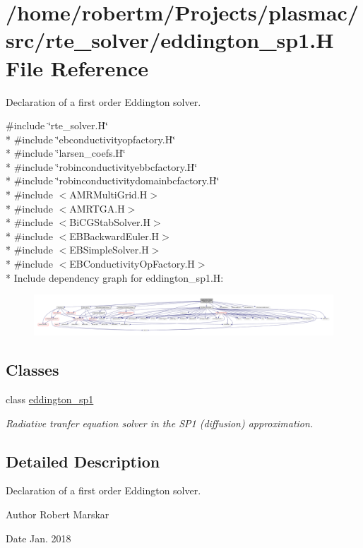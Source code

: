\hypertarget{eddington__sp1_8H}{}\section{/home/robertm/\+Projects/plasmac/src/rte\+\_\+solver/eddington\+\_\+sp1.H File Reference}
\label{eddington__sp1_8H}


Declaration of a first order Eddington solver.  


{\ttfamily \#include \char`\"{}rte\+\_\+solver.\+H\char`\"{}}\\*
{\ttfamily \#include \char`\"{}ebconductivityopfactory.\+H\char`\"{}}\\*
{\ttfamily \#include \char`\"{}larsen\+\_\+coefs.\+H\char`\"{}}\\*
{\ttfamily \#include \char`\"{}robinconductivityebbcfactory.\+H\char`\"{}}\\*
{\ttfamily \#include \char`\"{}robinconductivitydomainbcfactory.\+H\char`\"{}}\\*
{\ttfamily \#include $<$A\+M\+R\+Multi\+Grid.\+H$>$}\\*
{\ttfamily \#include $<$A\+M\+R\+T\+G\+A.\+H$>$}\\*
{\ttfamily \#include $<$Bi\+C\+G\+Stab\+Solver.\+H$>$}\\*
{\ttfamily \#include $<$E\+B\+Backward\+Euler.\+H$>$}\\*
{\ttfamily \#include $<$E\+B\+Simple\+Solver.\+H$>$}\\*
{\ttfamily \#include $<$E\+B\+Conductivity\+Op\+Factory.\+H$>$}\\*
Include dependency graph for eddington\+\_\+sp1.\+H\+:\nopagebreak
\begin{figure}[H]
\begin{center}
\leavevmode
\includegraphics[width=350pt]{eddington__sp1_8H__incl}
\end{center}
\end{figure}
\subsection*{Classes}
\begin{DoxyCompactItemize}
\item 
class \hyperlink{classeddington__sp1}{eddington\+\_\+sp1}
\begin{DoxyCompactList}\small\item\em Radiative tranfer equation solver in the S\+P1 (diffusion) approximation. \end{DoxyCompactList}\end{DoxyCompactItemize}


\subsection{Detailed Description}
Declaration of a first order Eddington solver. 

\begin{DoxyAuthor}{Author}
Robert Marskar 
\end{DoxyAuthor}
\begin{DoxyDate}{Date}
Jan. 2018 
\end{DoxyDate}
